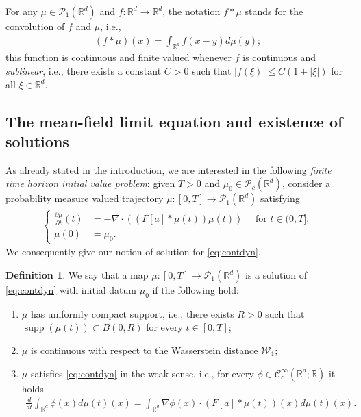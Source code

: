 \documentclass[A4paper,11pt]{article}
\theoremstyle{definition}
\newtheorem{definition}[theorem]{Definition}
\newcommand{\R}{\mathbb{R}}
\newcommand{\W}{\mathcal{W}}
\newcommand{\PP}{\mathcal{P}_1}
\newcommand{\PC}{\mathcal{P}_c}
\DeclareMathOperator{\supp}{supp}
\begin{document}
For any $\mu \in \PP(\R^d)$ and $f: \R^d \to \R^d$, the notation $f * \mu$ stands for the convolution of $f$ and $\mu$, i.e.,
\begin{align*}
(f * \mu)(x) = \int_{\R^d} f(x-y) d\mu(y);
\end{align*}
this function is continuous and finite valued whenever $f$ is continuous and \emph{sublinear}, i.e., there exists a constant $C > 0$ such that $| f(\xi) | \leq C (1 + |\xi|)$ for all $\xi \in \R^d$.

\subsection{The mean-field limit equation and existence of solutions}

As already stated in the introduction, we are interested in the following \textit{finite time horizon initial value problem}: given $T > 0$ and $\mu_0 \in \PC(\R^d)$, consider a probability measure valued trajectory $\mu:[0,T]\rightarrow \PP(\R^d)$ satisfying 
\begin{align}\label{eq:contdyn}
\left\{\begin{aligned}
\frac{\partial \mu}{\partial t}(t) &= -\nabla \cdot ((F[a]*\mu(t))\mu(t)) \quad \text{ for } t \in (0,T],\\
\mu(0) &=\mu_0.
\end{aligned}\right.
\end{align}
We consequently give our notion of solution for \eqref{eq:contdyn}.

\begin{definition}
We say that a map $\mu:[0,T]\rightarrow\PP(\R^d)$ is a solution of \eqref{eq:contdyn} with initial datum $\mu_0$ if the following hold:
\begin{enumerate}
\item $\mu$ has uniformly compact support, i.e., there exists $R > 0$ such that $\supp(\mu(t)) \subset B(0,R)$ for every $t \in [0,T]$;
\item $\mu$ is continuous with respect to the Wasserstein distance $\W_1$;
\item $\mu$ satisfies \eqref{eq:contdyn} in the weak sense, i.e., for every $\phi \in \mathcal{C}^{\infty}_c(\R^d;\R)$ it holds
\begin{align*}
\frac{d}{dt} \int_{\R^d} \phi(x) d\mu(t)(x) = \int_{\R^d} \nabla \phi(x) \cdot (F[a]*\mu(t))(x) d\mu(t)(x).
\end{align*}
\end{enumerate}
\end{definition}
\end{document}
